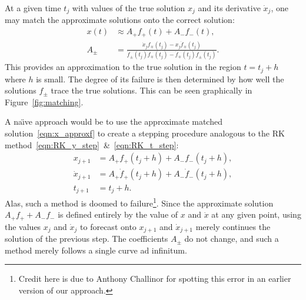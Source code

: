 At a given time \(t_j\) with values of the true solution \(x_j\) and its derivative \(\dot{x}_j\), one may match the approximate solutions onto the correct solution:
\begin{align}
    x(t) &\approx  A_+ f_+(t) + A_- f_-(t) ,
    \label{eqn:x_approxf}\\
    A_\pm &= \frac{\dot{x}_j f_\mp(t_j) - x_j \dot{f}_\mp(t_j) }{\dot{f}_\pm(t_j) f_\mp(t_j) - \dot{f}_\mp(t_j) f_\pm(t_j)}.
    \label{eqn:Apm}
\end{align}
This provides an approximation to the true solution in the region \(t=t_j + h\) where \(h\) is small. The degree of its failure is then determined by how well the solutions \(f_\pm\) trace the true solutions. This can be seen graphically in Figure~\ref{fig:matching}.

A na\"{\i}ve approach would be to use the approximate matched solution~\eqref{eqn:x_approxf} to create a stepping procedure analogous to the RK method~\eqref{eqn:RK_y_step}~\&~\eqref{eqn:RK_t_step}:
\begin{align}
  x_{j+1} &= A_+ f_+(t_j + h) + A_- f_-(t_j + h) ,\label{eqn:x_step_wrong}\\
  \dot{x}_{j+1} &= A_+ \dot{f}_+(t_j + h) + A_- \dot{f}_-(t_j + h) ,\label{eqn:x_dot_step_wrong}\\
  t_{j+1} &= t_j+h\label{eqn:t_step_wrong}.
\end{align}
Alas, such a method is doomed to failure\footnote{Credit here is due to Anthony Challinor for spotting this error in an earlier version of our approach.}. Since the approximate solution \(A_+ f_+ + A_- f_-\) is defined entirely by the value of \(x\) and \(\dot{x}\) at any given point, using the values \(x_j\) and \(\dot{x}_{j}\) to forecast onto \(x_{j+1}\) and \(\dot{x}_{j+1}\) merely continues the solution of the previous step. The coefficients \(A_\pm\) do not change, and such a method merely follows a single curve ad infinitum.

